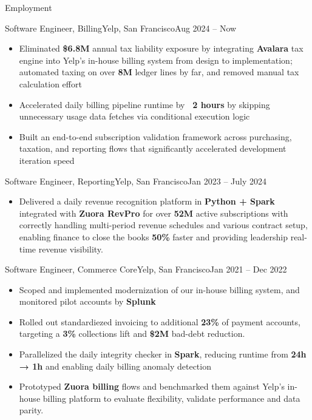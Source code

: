 \documentclass[]{mcdowellcv}
\begin{document}
\begin{cvsection}{Employment}
            \begin{cvsubsection}{Software Engineer, Billing}{Yelp, San Francisco}{Aug 2024 – Now}
                \begin{itemize}
                    \item Eliminated \textbf{\$6.8M} annual tax liability exposure by integrating \textbf{Avalara} tax engine into Yelp's in-house billing system from design to implementation; automated taxing on over \textbf{8M} ledger lines by far, and removed manual tax calculation effort
                    \item Accelerated daily billing pipeline runtime by \textbf{~2 hours} by skipping unnecessary usage data fetches via conditional execution logic
                    \item Built an end-to-end subscription validation framework across purchasing, taxation, and reporting flows that significantly accelerated development iteration speed
                \end{itemize}
		\end{cvsubsection}

            \begin{cvsubsection}{Software Engineer, Reporting}{Yelp, San Francisco}{Jan 2023 – July 2024}
                \begin{itemize}
                    \item Delivered a daily revenue recognition platform in \textbf{Python + Spark} integrated with \textbf{Zuora RevPro} for over \textbf{52M} active subscriptions with correctly handling multi-period revenue schedules and various contract setup, enabling finance to close the books \textbf{50\%} faster and providing leadership real-time revenue visibility.

                \end{itemize}
		\end{cvsubsection}

            \begin{cvsubsection}{Software Engineer, Commerce Core}{Yelp, San Francisco}{Jan 2021 – Dec 2022}
			\begin{itemize}
            \item Scoped and implemented modernization of our in-house billing system, and monitored pilot accounts by \textbf{Splunk}
            \item Rolled out standardiezed invoicing to additional \textbf{23\%} of payment accounts, targeting a \textbf{3\%} collections lift and \textbf{\$2M} bad-debt reduction.
            \item Parallelized the daily integrity checker in \textbf{Spark}, reducing runtime from \textbf{24h → 1h} and enabling daily billing anomaly detection
            \item Prototyped \textbf{Zuora billing} flows and benchmarked them against Yelp’s in-house billing platform to evaluate flexibility, validate performance and data parity.


\end{itemize}
\end{cvsubsection}
\end{cvsection}
\end{document}
